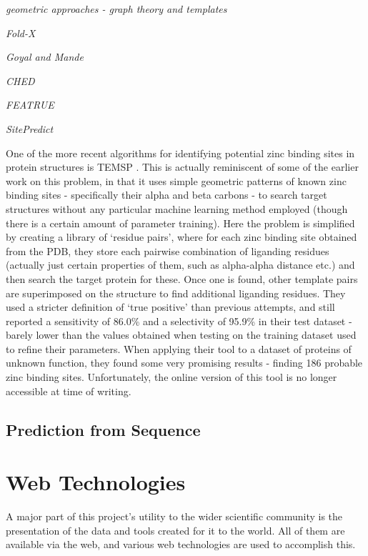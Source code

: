 \emph{geometric approaches - graph theory and templates}

\emph{Fold-X}

\emph{Goyal and Mande}

\emph{CHED}

\emph{FEATRUE}

\emph{SitePredict}


One of the more recent algorithms for identifying potential zinc binding sites in protein structures is TEMSP \cite{zhao2011structure}. This is actually reminiscent of some of the earlier work on this problem, in that it uses simple geometric patterns of known zinc binding sites - specifically their alpha and beta carbons - to search target structures without any particular machine learning method employed (though there is a certain amount of parameter training). Here the problem is simplified by creating a library of `residue pairs', where for each zinc binding site obtained from the PDB, they store each pairwise combination of liganding residues (actually just certain properties of them, such as alpha-alpha distance etc.) and then search the target protein for these. Once one is found, other template pairs are superimposed on the structure to find additional liganding residues. They used a stricter definition of `true positive' than previous attempts, and still reported a sensitivity of 86.0\% and a selectivity of 95.9\% in their test dataset - barely lower than the values obtained when testing on the training dataset used to refine their parameters. When applying their tool to a dataset of proteins of unknown function, they found some very promising results - finding 186 probable zinc binding sites.  Unfortunately, the online version of this tool is no longer accessible at time of writing.

\subsection{Prediction from Sequence}

\section{Web Technologies}

A major part of this project's utility to the wider scientific community is the presentation of the data and tools created for it to the world. All of them are available via the web, and various web technologies are used to accomplish this.

